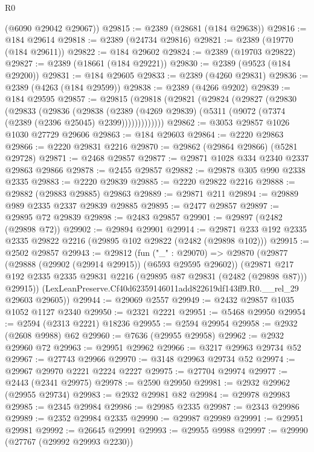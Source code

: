 \begin{lexlean}{R0}
\begin{coremodule}
      (@6090 @29042 @29067))
@29815 := @2389 (@28681 (@184 @29638))
@29816 := @184 @29614
@29818 := @2389 (@24734 @29816)
@29821 := @2389 (@19770 (@184 @29611))
@29822 := @184 @29602
@29824 := @2389 (@19703 @29822)
@29827 := @2389 (@18661 (@184 @29221))
@29830 := @2389 (@9523 (@184 @29200))
@29831 := @184 @29605
@29833 := @2389 (@4260 @29831)
@29836 := @2389 (@4263 (@184 @29599))
@29838 := @2389 (@4266 @9202)
@29839 := @184 @29595
@29857 := @29815
    (@29818
      (@29821
        (@29824
          (@29827
            (@29830
              (@29833
                (@29836
                  (@29838
                    (@2389
                      (@4269 @29839)
                      (@5311 (@9072 (@7374 (@2389 (@2396 @25045) @2399)))))))))))))
@29862 := @3053 @29857 @1026 @1030 @27729 @29606
@29863 := @184 @29603
@29864 := @2220 @29863
@29866 := @2220 @29831 @2216
@29870 := @29862 (@29864 @29866) (@5281 @29728)
@29871 := @2468 @29857
@29877 := @29871 @1028 @334 @2340 @2337 @29863 @29866
@29878 := @2455 @29857
@29882 := @29878 @305 @990 @2338 @2335
@29883 := @2220 @29839
@29885 := @2220 @29822 @2216
@29888 := @29882 (@29883 @29885) @29863
@29889 := @29871 @211
@29894 := @29889 @989 @2335 @2337 @29839 @29885
@29895 := @2477 @29857
@29897 := @29895 @72 @29839
@29898 := @2483 @29857
@29901 := @29897 (@2482 (@29898 @72))
@29902 := @29894 @29901
@29914 := @29871 @233 @192 @2335 @2335 @29822 @2216 (@29895 @102 @29822 (@2482 (@29898 @102)))
@29915 := @2502 @29857
@29943 := @29812
    (fun ("_" : @29070) =>
    @29870
      (@29877
        (@29888 (@29902 (@29914 @29915)) (@6593 @29595 @29602))
        (@29871 @217 @192 @2335 @2335 @29831 @2216 (@29895 @87 @29831 (@2482 (@29898 @87))) @29915))
      (LexLeanPreserve.Cf40d62359146011add822619df143ff9.R0.__rel_29 @29603 @29605))
@29944 := @29069 @2557
@29949 := @2432 @29857 @1035 @1052 @1127 @2340
@29950 := @2321 @2221
@29951 := @5468 @29950
@29954 := @2594 (@2313 @2221) @18236
@29955 := @2594 @29954
@29958 := @2932 (@2608 @9988) @62
@29960 := @7636 (@29955 @29958)
@29962 := @2932 @29960 @72
@29963 := @29951 @29962
@29966 := @3217 @29963 @29734 @52
@29967 := @27743 @29966
@29970 := @3148 @29963 @29734 @52
@29974 := @29967 @29970 @2221 @2224 @2227
@29975 := @27704 @29974
@29977 := @2443 (@2341 @29975)
@29978 := @2590 @29950
@29981 := @2932 @29962 (@29955 @29734)
@29983 := @2932 @29981 @82
@29984 := @29978 @29983
@29985 := @2345 @29984
@29986 := @29985 @2335
@29987 := @2343 @29986
@29989 := @2352 @29984 @2335
@29990 := @29987 @29989
@29991 := @29951 @29981
@29992 := @26645 @29991
@29993 := @29955 @9988
@29997 := @29990 (@27767 (@29992 @29993 @2230))

\end{coremodule}
\end{lexlean}
